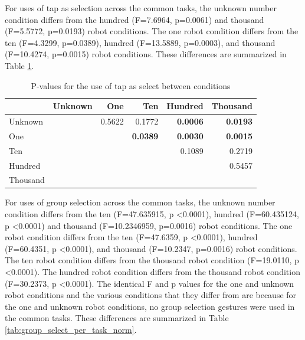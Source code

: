 For uses of tap as selection across the common tasks, the unknown number condition differs from the hundred (F=7.6964, p=0.0061) and thousand (F=5.5772, p=0.0193) robot conditions. 
The one robot condition differs from the ten (F=4.3299, p=0.0389), hundred (F=13.5889, p=0.0003), and thousand (F=10.4274, p=0.0015) robot conditions.
These differences are summarized in Table \ref{tab:tap_select_per_task_norm}.

\begin{table}
\centering
	\begin{tabular}{l|r r r r r}
		& Unknown & One    & Ten        & Hundred     & Thousand   \\ 
		\hline
		Unknown & & 0.5622 & 0.1772 & \textbf{0.0006} & \textbf{0.0193} \\   
		One & & & \textbf{0.0389} & \textbf{0.0030} & \textbf{0.0015} \\
		Ten & & & & 0.1089 & 0.2719   \\
		Hundred & & & & & 0.5457   \\
		Thousand & & & & &\\
	\end{tabular}
	\caption{P-values for the use of tap as select between conditions}
	\label{tab:tap_select_per_task_norm}
\end{table}

For uses of group selection across the common tasks, the unknown number condition differs from the ten (F=47.635915, p \textless 0.0001), hundred (F=60.435124, p \textless 0.0001) and thousand (F=10.2346959, p=0.0016) robot conditions. 
The one robot condition differs from the ten (F=47.6359, p \textless 0.0001), hundred (F=60.4351, p \textless 0.0001), and thousand (F=10.2347, p=0.0016) robot conditions.
The ten robot condition differs from the thousand robot condition (F=19.0110, p \textless 0.0001).
The hundred robot condition differs from the thousand robot condition (F=30.2373, p \textless 0.0001).
The identical F and p values for the one and unknown robot conditions and the various conditions that they differ from are because for the one and unknown robot conditions, no group selection gestures were used in the common tasks. 
These differences are summarized in Table \ref{tab:group_select_per_task_norm}.

